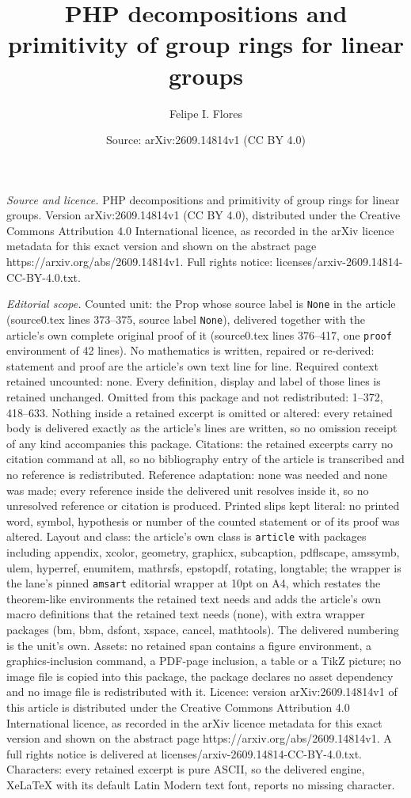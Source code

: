 \documentclass[10pt,a4paper]{amsart}
\title[PHP decompositions and primitivity of group rings for linear]{PHP decompositions and primitivity of group rings for linear groups}
\author{Felipe I. Flores}
\date{Source: arXiv:2609.14814v1 (CC BY 4.0)}
\begin{document}
\maketitle

\noindent\emph{Source and licence.} PHP decompositions and primitivity of group rings for linear groups. Version arXiv:2609.14814v1 (CC BY 4.0), distributed under the Creative Commons Attribution 4.0 International licence, as recorded in the arXiv licence metadata for this exact version and shown on the abstract page https://arxiv.org/abs/2609.14814v1. Full rights notice: licenses/arxiv-2609.14814-CC-BY-4.0.txt.\par\smallskip

\noindent\textit{Editorial scope.} Counted unit: the Prop whose source label is \texttt{None} in the article (source0.tex lines 373--375, source label \texttt{None}), delivered together with the article's own complete original proof of it (source0.tex lines 376--417, one \texttt{proof} environment of 42 lines). No mathematics is written, repaired or re-derived: statement and proof are the article's own text line for line. Required context retained uncounted: none. Every definition, display and label of those lines is retained unchanged. Omitted from this package and not redistributed: 1--372, 418--633. Nothing inside a retained excerpt is omitted or altered: every retained body is delivered exactly as the article's lines are written, so no omission receipt of any kind accompanies this package. Citations: the retained excerpts carry no citation command at all, so no bibliography entry of the article is transcribed and no reference is redistributed. Reference adaptation: none was needed and none was made; every reference inside the delivered unit resolves inside it, so no unresolved reference or citation is produced. Printed slips kept literal: no printed word, symbol, hypothesis or number of the counted statement or of its proof was altered. Layout and class: the article's own class is \texttt{article} with packages including appendix, xcolor, geometry, graphicx, subcaption, pdflscape, amssymb, ulem, hyperref, enumitem, mathrsfs, epstopdf, rotating, longtable; the wrapper is the lane's pinned \texttt{amsart} editorial wrapper at 10pt on A4, which restates the theorem-like environments the retained text needs and adds the article's own macro definitions that the retained text needs (none), with extra wrapper packages (bm, bbm, dsfont, xspace, cancel, mathtools). The delivered numbering is the unit's own. Assets: no retained span contains a figure environment, a graphics-inclusion command, a PDF-page inclusion, a table or a TikZ picture; no image file is copied into this package, the package declares no asset dependency and no image file is redistributed with it. Licence: version arXiv:2609.14814v1 of this article is distributed under the Creative Commons Attribution 4.0 International licence, as recorded in the arXiv licence metadata for this exact version and shown on the abstract page https://arxiv.org/abs/2609.14814v1. A full rights notice is delivered at licenses/arxiv-2609.14814-CC-BY-4.0.txt. Characters: every retained excerpt is pure ASCII, so the delivered engine, XeLaTeX with its default Latin Modern text font, reports no missing character.
\end{document}
